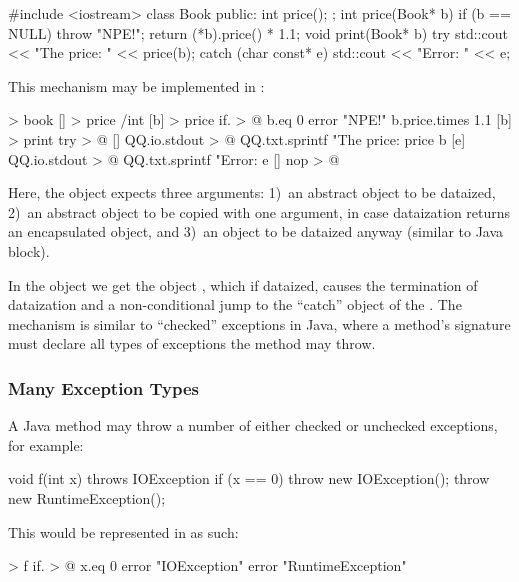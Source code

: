 \documentclass[sigplan,nonacm]{acmart}
\begin{document}
\begin{ffcode}
#include <iostream>
class Book { public: int price(); };
int price(Book* b) {
  if (b == NULL) throw "NPE!";
  return (*b).price() * 1.1;
}
void print(Book* b) {
  try {
    std::cout << "The price: " << price(b);
  } catch (char const* e) {
    std::cout << "Error: " << e;
  }
}
\end{ffcode}

This mechanism may be implemented in \eolang{}:

\begin{ffcode}
[] > book
  [] > price /int
[b] > price
  if. > @
    b.eq 0
    error "NPE!"
    b.price.times 1.1
[b] > print
  try > @
    []
      QQ.io.stdout > @
        QQ.txt.sprintf
        "The price: %
        price b
    [e]
      QQ.io.stdout > @
        QQ.txt.sprintf
        "Error: %
        e
    []
      nop > @
\end{ffcode}

Here, the object  expects three arguments: 1)~an abstract object to be dataized, 2)~an abstract object to be copied with one argument, in case dataization returns an encapsulated object, and 3)~an object to be dataized anyway (similar to Java  block).

In the object  we get the object , which if dataized, causes the termination of dataization and a non-conditional jump to the ``catch'' object of the . The mechanism is similar to ``checked'' exceptions in Java, where a method's signature must declare all types of exceptions the method may throw.

\subsubsection{Many Exception Types}

A Java method may throw a number of either checked or unchecked exceptions, for example:

\begin{ffcode}
void f(int x) throws IOException {
  if (x == 0) {
    throw new IOException();
  }
  throw new RuntimeException();
}
\end{ffcode}

This would be represented in \eolang{} as such:

\begin{ffcode}
[x] > f
  if. > @
    x.eq 0
    error "IOException"
    error "RuntimeException"
\end{ffcode}
\end{document}
